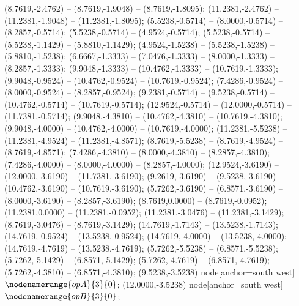    (8.7619,-2.4762) -- (8.7619,-1.9048) -- (8.7619,-1.8095);
   (11.2381,-2.4762) -- (11.2381,-1.9048) -- (11.2381,-1.8095);
   (5.5238,-0.5714) -- (8.0000,-0.5714) -- (8.2857,-0.5714);
   (5.5238,-0.5714) -- (4.9524,-0.5714);
   (5.5238,-0.5714) -- (5.5238,-1.1429) -- (5.8810,-1.1429);
   (4.9524,-1.5238) -- (5.5238,-1.5238) -- (5.8810,-1.5238);
   (6.6667,-1.3333) -- (7.0476,-1.3333) -- (8.0000,-1.3333) -- (8.2857,-1.3333);
   (9.9048,-1.3333) -- (10.4762,-1.3333) -- (10.7619,-1.3333);
   (9.9048,-0.9524) -- (10.4762,-0.9524) -- (10.7619,-0.9524);
   (7.4286,-0.9524) -- (8.0000,-0.9524) -- (8.2857,-0.9524);
   (9.2381,-0.5714) -- (9.5238,-0.5714) -- (10.4762,-0.5714) -- (10.7619,-0.5714);
   (12.9524,-0.5714) -- (12.0000,-0.5714) -- (11.7381,-0.5714);
   (9.9048,-4.3810) -- (10.4762,-4.3810) -- (10.7619,-4.3810);
   (9.9048,-4.0000) -- (10.4762,-4.0000) -- (10.7619,-4.0000);
   (11.2381,-5.5238) -- (11.2381,-4.9524) -- (11.2381,-4.8571);
   (8.7619,-5.5238) -- (8.7619,-4.9524) -- (8.7619,-4.8571);
   (7.4286,-4.3810) -- (8.0000,-4.3810) -- (8.2857,-4.3810);
   (7.4286,-4.0000) -- (8.0000,-4.0000) -- (8.2857,-4.0000);
   (12.9524,-3.6190) -- (12.0000,-3.6190) -- (11.7381,-3.6190);
   (9.2619,-3.6190) -- (9.5238,-3.6190) -- (10.4762,-3.6190) -- (10.7619,-3.6190);
   (5.7262,-3.6190) -- (6.8571,-3.6190) -- (8.0000,-3.6190) -- (8.2857,-3.6190);
   (8.7619,0.0000) -- (8.7619,-0.0952);
   (11.2381,0.0000) -- (11.2381,-0.0952);
   (11.2381,-3.0476) -- (11.2381,-3.1429);
   (8.7619,-3.0476) -- (8.7619,-3.1429);
   (14.7619,-1.7143) -- (13.5238,-1.7143);
   (14.7619,-0.9524) -- (13.5238,-0.9524);
   (14.7619,-4.0000) -- (13.5238,-4.0000);
   (14.7619,-4.7619) -- (13.5238,-4.7619);
   (5.7262,-5.5238) -- (6.8571,-5.5238);
   (5.7262,-5.1429) -- (6.8571,-5.1429);
   (5.7262,-4.7619) -- (6.8571,-4.7619);
   (5.7262,-4.3810) -- (6.8571,-4.3810);
   (9.5238,-3.5238) node[anchor=south west] {$\nodenamerange{opA}{3}{0}$};
   (12.0000,-3.5238) node[anchor=south west] {$\nodenamerange{opB}{3}{0}$};
